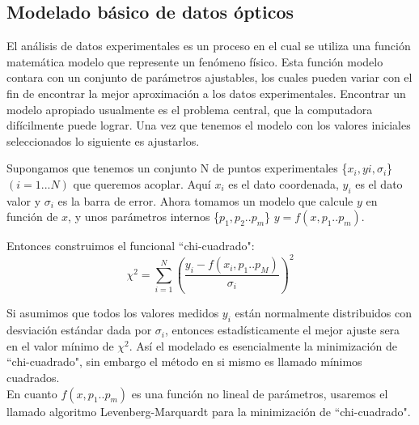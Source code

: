 \documentclass[a4paper,openright,12pt]{book}
\begin{document}
\subsection{Modelado básico de datos ópticos}
El análisis de datos experimentales es un proceso en el cual se utiliza una función matemática modelo que represente un fenómeno físico. Esta función modelo contara con un conjunto de parámetros ajustables, los cuales pueden variar con el fin de encontrar la mejor aproximación a los datos experimentales. Encontrar un modelo apropiado usualmente es el problema central, que la computadora difícilmente puede lograr. Una vez que tenemos el modelo con los valores iniciales seleccionados lo siguiente es ajustarlos.

Supongamos que tenemos un conjunto N de puntos experimentales \{$x_{i}, y{i}, \sigma_{i}$\} $(i=1...N)$ que queremos acoplar. Aquí $x_{i}$ es el dato coordenada, $y_{i}$ es el dato valor y $\sigma_{i}$ es la barra de error. Ahora tomamos un modelo que calcule $y$ en función de $x$,  y unos parámetros internos \{$p_{1},p_{2}..p_{m}$\} $y=f(x,p_{1}..p_{m})$.\

Entonces construimos el funcional ``chi-cuadrado":\\

\begin{equation}
 \chi^{2}=\sum_{i=1}^{N}(\frac{y_{i}-f(x_{i},p_{1}..p_{M})}{\sigma_{i}})^{2} 
\end{equation}

Si asumimos que todos los valores medidos $y_{i}$ están normalmente distribuidos con desviación estándar dada por $\sigma_{i}$, entonces estadísticamente  el mejor ajuste sera en el valor mínimo de $\chi^{2}$. Así el modelado es esencialmente la minimización de ``chi-cuadrado", sin embargo el método en si mismo es llamado mínimos cuadrados\cite{guide}.\\
En cuanto $f(x,p_{1}..p_{m})$ es una función no lineal de parámetros, usaremos el llamado algoritmo Levenberg-Marquardt para la minimización de ``chi-cuadrado".
\end{document}
